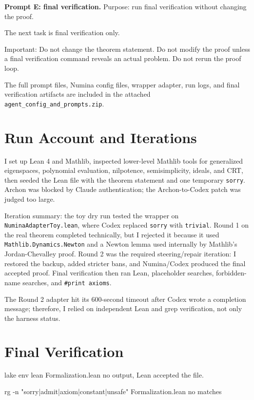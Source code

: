 \documentclass[12pt]{article}
\begin{document}
\textbf{Prompt E: final verification.} Purpose: run final verification without changing the proof.

\begin{PromptBlock}
The next task is final verification only.

Important:
Do not change the theorem statement.
Do not modify the proof unless a final verification command reveals an actual problem.
Do not rerun the proof loop.
\end{PromptBlock}

The full prompt files, Numina config files, wrapper adapter, run logs, and final verification artifacts are included in the attached \texttt{agent\_config\_and\_prompts.zip}.

\section{Run Account and Iterations}

I set up Lean 4 and Mathlib, inspected lower-level Mathlib tools for generalized eigenspaces, polynomial evaluation, nilpotence, semisimplicity, ideals, and CRT, then seeded the Lean file with the theorem statement and one temporary \texttt{sorry}. Archon was blocked by Claude authentication; the Archon-to-Codex patch was judged too large.

Iteration summary: the toy dry run tested the wrapper on \texttt{NuminaAdapterToy.lean}, where Codex replaced \texttt{sorry} with \texttt{trivial}. Round 1 on the real theorem completed technically, but I rejected it because it used \texttt{Mathlib.Dynamics.Newton} and a Newton lemma used internally by Mathlib's Jordan-Chevalley proof. Round 2 was the required steering/repair iteration: I restored the backup, added stricter bans, and Numina/Codex produced the final accepted proof. Final verification then ran Lean, placeholder searches, forbidden-name searches, and \texttt{\#print axioms}.

The Round 2 adapter hit its 600-second timeout after Codex wrote a completion message; therefore, I relied on independent Lean and grep verification, not only the harness status.

\section{Final Verification}

\begin{CodeBlock}
lake env lean Formalization.lean
no output, Lean accepted the file.

rg -n "sorry|admit|axiom|constant|unsafe" Formalization.lean
no matches
\end{CodeBlock}
\end{document}
